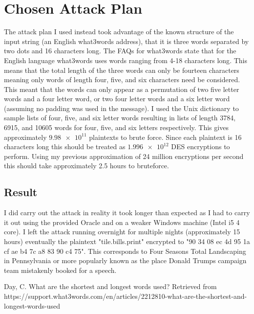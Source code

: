 \documentclass[11pt,a4paper]{article}
\begin{document}
\section*{Chosen Attack Plan}
The attack plan I used instead took advantage of the known structure of the input string (an English what3words address), that it is three words separated by two dots and 16 characters long. The FAQs for what3words state that for the English language what3words uses words ranging from 4-18 characters long\cite{what3words}. This means that the total length of the three words can only be fourteen characters meaning only words of length four, five, and six characters need be considered. This meant that the words can only appear as a permutation of two five letter words and a four letter word, or two four letter words and a six letter word (assuming no padding was used in the message). I used the Unix dictionary to sample lists of four, five, and six letter words resulting in lists of length 3784, 6915, and 10605 words for four, five, and six letters respectively. This gives approximately $\num{9.98e11}$ plaintexts to brute force. Since each plaintext is 16 characters long this should be treated as $\num{1.996e12}$ DES encryptions to perform. Using my previous approximation of 24 million encryptions per second this should take approximately 2.5 hours to bruteforce.
\subsection*{Result}
I did carry out the attack in reality it took longer than expected as I had to carry it out using the provided Oracle and on a weaker Windows machine (Intel i5 4 core). I left the attack running overnight for multiple nights (approximately 15 hours) eventually the plaintext "tile.bills.print" encrypted to "90 34 08 ec 4d 95 1a cf ae b4 7c a8 83 90 c4 75". This corresponds to Four Seasons Total Landscaping in Pennsylvania or more popularly known as the place Donald Trumps campaign team mistakenly booked for a speech.

\begin{thebibliography}{}
Day, C. What are the shortest and longest words used? Retrieved from https://support.what3words.com/en/articles/2212810-what-are-the-shortest-and-longest-words-used
\end{thebibliography}
\end{document}
